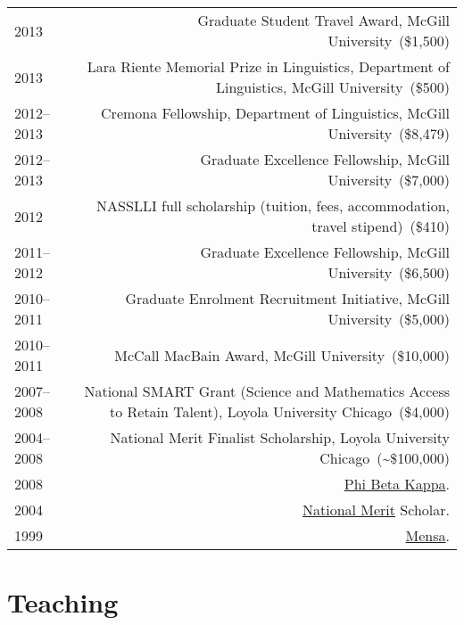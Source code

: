 \documentclass[letterpaper]{article}
\makeatletter
\newcommand{\myvrule}{\color{lightgray}\vrule width 1.0pt}
\newenvironment{cvsection}{%
  \vspace{-3ex}
  \renewcommand{\arraystretch}{1.5}
  \begin{longtable}{@{} L R @{}}
}{%
  \end{longtable}
  \vspace{1ex}
  \renewcommand{\arraystretch}{1.0}
}
\newcommand{\award}[2]{%
  #1~(#2) %
}
\makeatother
\begin{document}
\begin{cvsection}
  2013 & \award{Graduate Student Travel Award, McGill University}{\$1,500} \\

  2013 & \award{Lara Riente Memorial Prize in Linguistics, Department of
  Linguistics, McGill University}{\$500} \\

  2012--2013 & \award{Cremona Fellowship, Department of Linguistics, McGill
  University}{\$8,479} \\

  2012--2013 & \award{Graduate Excellence Fellowship, McGill
  University}{\$7,000} \\

  2012 & \award{NASSLLI full scholarship (tuition, fees, accommodation, travel
  stipend)}{\$410} \\

  2011--2012 & \award{Graduate Excellence Fellowship, McGill
  University}{\$6,500} \\

  2010--2011 & \award{Graduate Enrolment Recruitment Initiative, McGill
  University}{\$5,000} \\

  2010--2011 & \award{McCall MacBain Award, McGill University}{\$10,000} \\

  2007--2008 & \award{National SMART Grant (Science and Mathematics Access to
  Retain Talent), Loyola University Chicago}{\$4,000} \\

  2004--2008 & \award{National Merit Finalist Scholarship, Loyola University
  Chicago}{\textasciitilde\$100,000} \\

  2008 & \href{http://www.pbk.org/}{Phi Beta Kappa}. \\

  2004 & \href{http://www.nationalmerit.org/}{National Merit} Scholar. \\

  1999 & \href{http://www.mensa.org/}{Mensa}.
\end{cvsection}



\section*{Teaching}
\end{document}
